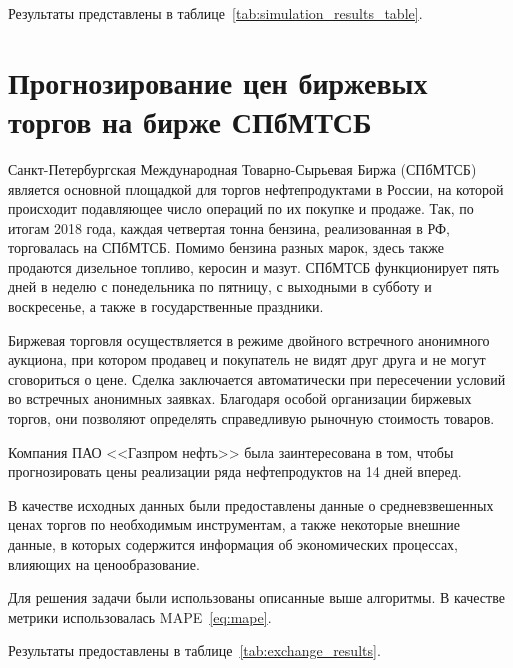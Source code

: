 \documentclass[a4paper,article,14pt]{extarticle}
\begin{document}
Результаты представлены в таблице~\ref{tab:simulation_results_table}.


\pagebreak

\section{Прогнозирование цен биржевых торгов на бирже СПбМТСБ}

Санкт-Петербургская Международная Товарно-Сырьевая Биржа \linebreak
(СПбМТСБ)~\cite{spimex} является основной площадкой для торгов нефтепродуктами в России, на которой происходит подавляющее число операций по их покупке и продаже.
Так, по итогам 2018 года, каждая четвертая тонна бензина, реализованная в РФ, торговалась на СПбМТСБ.
Помимо бензина разных марок, здесь также продаются дизельное топливо, керосин и мазут.
СПбМТСБ функционирует пять дней в неделю с понедельника по пятницу, с выходными в субботу и воскресенье, а также в государственные праздники.

Биржевая торговля осуществляется в режиме двойного встречного анонимного аукциона, при котором продавец и покупатель не видят друг друга и не могут сговориться о цене.
Сделка заключается автоматически при пересечении условий во встречных анонимных заявках.
Благодаря особой организации биржевых торгов, они позволяют определять справедливую рыночную стоимость товаров.

Компания ПАО <<Газпром нефть>> была заинтересована в том, чтобы прогнозировать цены реализации ряда нефтепродуктов на 14 дней вперед.

В качестве исходных данных были предоставлены данные о средневзвешенных ценах торгов по необходимым инструментам, а также некоторые внешние данные, в которых содержится информация об экономических процессах, влияющих на ценообразование.


Для решения задачи были использованы описанные выше алгоритмы.
В качестве метрики использовалась MAPE~\eqref{eq:mape}.

Результаты предоставлены в таблице~\ref{tab:exchange_results}.
\end{document}
